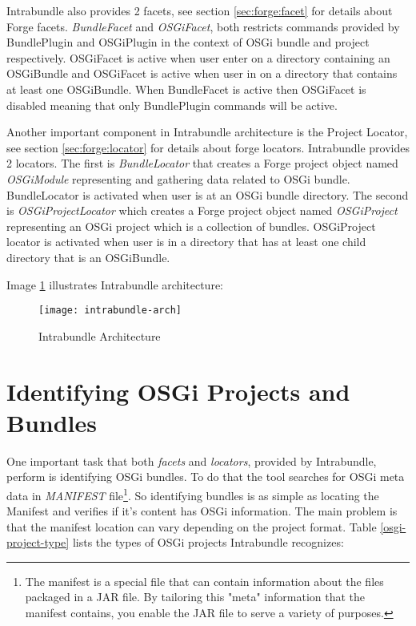 Intrabundle also provides 2 facets, see section \ref{sec:forge:facet} for details about Forge facets. \emph{BundleFacet} and \emph{OSGiFacet}, both restricts commands provided by BundlePlugin and OSGiPlugin in the context of OSGi bundle and project respectively. OSGiFacet is active when user enter on a directory containing an OSGiBundle and OSGiFacet is active when user in on a directory that contains at least one OSGiBundle. When BundleFacet is active then OSGiFacet is disabled meaning that only BundlePlugin commands will be active. 

Another important component in Intrabundle architecture is the Project Locator, see section \ref{sec:forge:locator} for details about forge locators. Intrabundle provides 2 locators. The first is \emph{BundleLocator} that creates a Forge project object named \emph{OSGiModule} representing and gathering data related to OSGi bundle. BundleLocator is activated when user is at an OSGi bundle directory. The second is \emph{OSGiProjectLocator} which creates a Forge project object named \emph{OSGiProject} representing an OSGi project which is a collection of bundles. OSGiProject locator is activated when user is in a directory that has at least one child directory that is an OSGiBundle.          

Image \ref{intrabundle-arch} illustrates Intrabundle architecture:

\begin{figure}[h]
\caption{Intrabundle Architecture}
\label{intrabundle-arch}
\centering
\texttt{[image: intrabundle-arch]}
\end{figure}  
\FloatBarrier


\section{Identifying OSGi Projects and Bundles}
One important task that both \emph{facets} and \emph{locators}, provided by Intrabundle, perform is identifying OSGi bundles. To do that the tool searches for OSGi meta data in \emph{MANIFEST} file\footnote{The manifest is a special file that can contain information about the files packaged in a JAR file. By tailoring this "meta" information that the manifest contains, you enable the JAR file to serve a variety of purposes.}. So identifying bundles is as simple as locating the Manifest and verifies if it's content has OSGi information. The main problem is that the manifest location can vary depending on the project format. Table \ref{osgi-project-type} lists the types of OSGi projects Intrabundle recognizes:     

